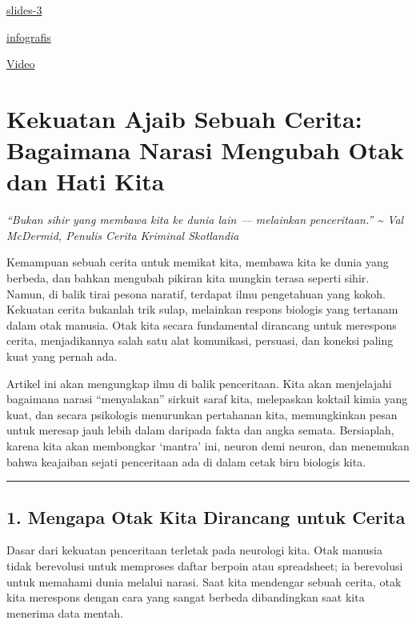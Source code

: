 \documentclass[
  letterpaper,
  DIV=11,
  numbers=noendperiod]{scrreprt}
\begin{document}
\href{../bahan/K-12-Strategic_Narrative_Engineering.pdf}{slides-3}

\href{../bahan/story_telling.png}{infografis}

\href{../bahan/Menguasai_Cerita_Reputasi.mp4}{Video}

\section{Kekuatan Ajaib Sebuah Cerita: Bagaimana Narasi Mengubah Otak
dan Hati
Kita}\label{kekuatan-ajaib-sebuah-cerita-bagaimana-narasi-mengubah-otak-dan-hati-kita}

\emph{``Bukan sihir yang membawa kita ke dunia lain --- melainkan
penceritaan.'' \textasciitilde{} Val McDermid, Penulis Cerita Kriminal
Skotlandia}

Kemampuan sebuah cerita untuk memikat kita, membawa kita ke dunia yang
berbeda, dan bahkan mengubah pikiran kita mungkin terasa seperti sihir.
Namun, di balik tirai pesona naratif, terdapat ilmu pengetahuan yang
kokoh. Kekuatan cerita bukanlah trik sulap, melainkan respons biologis
yang tertanam dalam otak manusia. Otak kita secara fundamental dirancang
untuk merespons cerita, menjadikannya salah satu alat komunikasi,
persuasi, dan koneksi paling kuat yang pernah ada.

Artikel ini akan mengungkap ilmu di balik penceritaan. Kita akan
menjelajahi bagaimana narasi ``menyalakan'' sirkuit saraf kita,
melepaskan koktail kimia yang kuat, dan secara psikologis menurunkan
pertahanan kita, memungkinkan pesan untuk meresap jauh lebih dalam
daripada fakta dan angka semata. Bersiaplah, karena kita akan membongkar
`mantra' ini, neuron demi neuron, dan menemukan bahwa keajaiban sejati
penceritaan ada di dalam cetak biru biologis kita.

\begin{center}\rule{0.5\linewidth}{0.5pt}\end{center}

\subsection{1. Mengapa Otak Kita Dirancang untuk
Cerita}\label{mengapa-otak-kita-dirancang-untuk-cerita}

Dasar dari kekuatan penceritaan terletak pada neurologi kita. Otak
manusia tidak berevolusi untuk memproses daftar berpoin atau
spreadsheet; ia berevolusi untuk memahami dunia melalui narasi. Saat
kita mendengar sebuah cerita, otak kita merespons dengan cara yang
sangat berbeda dibandingkan saat kita menerima data mentah.
\end{document}
